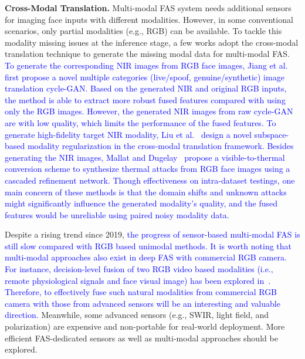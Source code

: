\documentclass[10pt,journal,compsoc]{IEEEtran}
\begin{document}
\noindent\textbf{Cross-Modal Translation.}\quad
Multi-modal FAS system needs additional sensors for imaging face inputs with different modalities. However, in some conventional scenarios, only partial modalities (e.g., RGB) can be available. To tackle this modality missing issues at the inference stage, a few works adopt the cross-modal translation technique to generate the missing modal data for multi-modal FAS. \textcolor{blue}{To generate the corresponding NIR images from RGB face images, Jiang et al.~\cite{jiang2020face} first propose a novel multiple categories (live/spoof, genuine/synthetic) image translation cycle-GAN. Based on the generated NIR and original RGB inputs, the method is able to extract more robust fused features compared with using only the RGB images. However, the generated NIR images from raw cycle-GAN are with low quality, which limits the performance of the fused features. To generate high-fidelity target NIR modality, Liu et al.~\cite{liu2021face} design a novel subspace-based modality regularization in the cross-modal translation framework. Besides generating the NIR images, Mallat and Dugelay~\cite{mallatindirect2021} propose a visible-to-thermal conversion scheme to synthesize thermal attacks from RGB face images using a cascaded refinement network. Though effectiveness on intra-dataset testings, one main concern of these methods is that the domain shifts and unknown attacks might significantly influence the generated modality's quality, and the fused features would be unreliable using paired noisy modality data.}


Despite a rising trend since 2019, \textcolor{blue}{the progress of sensor-based multi-modal FAS is still slow compared with RGB based unimodal methods. It is worth noting that multi-modal approaches also exist in deep FAS with commercial RGB camera. For instance, decision-level fusion of two RGB video based modalities (i.e., remote physiological signals and face visual image) has been explored in~\cite{lin2019face}. Therefore, to effectively fuse such natural modalities from commercial RGB camera with those from advanced sensors will be an interesting and valuable direction.} Meanwhile, some advanced sensors (e.g., SWIR, light field, and polarization) are expensive and non-portable for real-world deployment. More efficient FAS-dedicated sensors as well as multi-modal approaches should be explored.  




\vspace{-0.3em}
\end{document}
